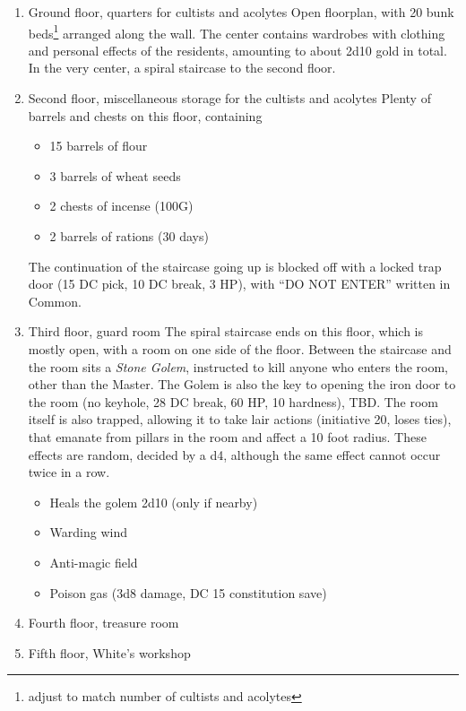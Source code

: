 \begin{enumerate}
\item Ground floor, quarters for cultists and acolytes
Open floorplan, with 20 bunk beds\footnote{adjust to match number of cultists and acolytes} arranged along the wall. The center contains wardrobes with clothing and personal effects of the residents, amounting to about 2d10 gold in total. In the very center, a spiral staircase to the second floor.

\item Second floor, miscellaneous storage for the cultists and acolytes
Plenty of barrels and chests on this floor, containing 
\begin{itemize}
\item 15 barrels of flour
\item 3 barrels of wheat seeds
\item 2 chests of incense (100G)
\item 2 barrels of rations (30 days)
\end{itemize}
The continuation of the staircase going up is blocked off with a locked trap door (15 DC pick, 10 DC break, 3 HP), with ``DO NOT ENTER'' written in Common.
\item Third floor, guard room
The spiral staircase ends on this floor, which is mostly open, with a room on one side of the floor. Between the staircase and the room sits a \textit{Stone Golem}, instructed to kill anyone who enters the room, other than the Master. The Golem is also the key to opening the iron door to the room (no keyhole, 28 DC break, 60 HP, 10 hardness), TBD. The room itself is also trapped, allowing it to take lair actions (initiative 20, loses ties), that emanate from pillars in the room and affect a 10 foot radius. These effects are random, decided by a d4, although the same effect cannot occur twice in a row.
\begin{itemize}
\item Heals the golem 2d10 (only if nearby)
\item Warding wind
\item Anti-magic field
\item Poison gas (3d8 damage, DC 15 constitution save)
\end{itemize}
\item Fourth floor, treasure room
\item Fifth floor, White's workshop
\end{enumerate}